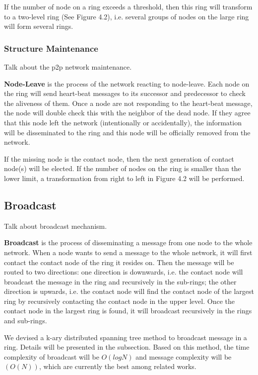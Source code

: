 If the number of node on a ring exceeds a threshold, then this ring will transform to a two-level ring (See Figure 4.2), i.e. several groups of nodes on the large ring will form several rings.

\subsubsection{Structure Maintenance}

Talk about the p2p network maintenance.

\textbf{Node-Leave} is the process of the network reacting to node-leave. Each node on the ring will send heart-beat messages to its successor and predecessor to check the aliveness of them. Once a node are not responding to the heart-beat message, the node will double check this with the neighbor of the dead node. If they agree that this node left the network (intentionally or accidentally), the information will be disseminated to the ring and this node will be officially removed from the network.

If the missing node is the contact node, then the next generation of contact node(s) will be elected. If the number of nodes on the ring is smaller than the lower limit, a transformation from right to left in Figure 4.2 will be performed.

\subsection{Broadcast}

Talk about broadcast mechanism.

\textbf{Broadcast} is the process of disseminating a message from one node to the whole network. When a node wants to send a message to the whole network, it will first contact the contact node of the ring it resides on. Then the message will be routed to two directions: one direction is downwards, i.e. the contact node will broadcast the message in the ring and recursively in the sub-rings; the other direction is upwards, i.e. the contact node will find the contact node of the largest ring by recursively contacting the contact node in the upper level. Once the contact node in the largest ring is found, it will broadcast recursively in the rings and sub-rings.

We devised a k-ary distributed spanning tree method to broadcast message in a ring. Details will be presented in the subsection. Based on this method, the time complexity of broadcast will be $O(logN)$ and message complexity will be $(O(N))$, which are currently the best among related works.

